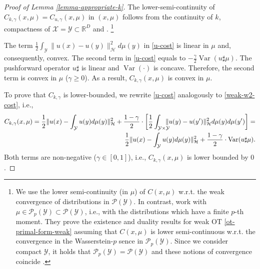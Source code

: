 \documentclass{article} %
\DeclareMathOperator{\Var}{Var}
\begin{document}
\begin{proof}[Proof of Lemma \ref{lemma-appropriate-k}] The  lower-semi-continuity of $C_{k,\gamma}(x,\mu)=C_{u,\gamma}(x,\mu)$ in $(x,\mu)$ follows from the continuity of $k$, compactness of $\mathcal{X}=\mathcal{Y}\subset\mathbb{R}^{D}$ and \citep[Lemma 7.3]{santambrogio2015optimal}.
\footnote{We use the lower semi-continuity (in $\mu$) of $C(x,\mu)$ w.r.t. the weak convergence of distributions in $\mathcal{P}(\mathcal{Y})$. In contrast, \cite{backhoff2019existence} work with $\mu\in \mathcal{P}_{p}(\mathcal{Y})\subset \mathcal{P}(\mathcal{Y})$, i.e., with the distributions which have a finite $p$-th moment. They prove the existence and duality results for weak OT \eqref{ot-primal-form-weak} assuming that $C(x,\mu)$ is lower semi-continuous w.r.t. the convergence in the Wasserstein-$p$ sence in $\mathcal{P}_{p}(\mathcal{Y})$. Since we consider compact $\mathcal{Y}$, it holds that $\mathcal{P}_{p}(\mathcal{Y})= \mathcal{P}(\mathcal{Y})$ and these notions of convergence coincide \citep[Def. 6.8]{villani2008optimal}.}

The term $\frac{1}{2}\int_{\mathcal{Y}}\|u(x)-u(y)\|^{2}_{\mathcal{H}}d\mu(y)$ in \eqref{u-cost} is linear in $\mu$ and, consequently, convex. The second term in \eqref{u-cost} equals to $-\frac{\gamma}{2}\Var(u\sharp\mu)$. The pushforward operator $u\sharp$ is linear and $\Var(\cdot)$ is concave. Therefore, the second term is convex in $\mu$ ($\gamma\geq 0$). As a result, $C_{k,\gamma}(x,\mu)$ is convex in $\mu$.

To prove that $C_{k,\gamma}$ is lower-bounded, we rewrite \eqref{u-cost} analogously to \eqref{weak-w2-cost}, i.e.,
\begin{eqnarray}
    C_{k,\gamma}(x,\mu)=\frac{1}{2}\|u(x)-\int_{\mathcal{Y}}u(y)d\mu(y)\|^{2}_{\mathcal{H}}+\frac{1-\gamma}{2}\cdot\bigg[\frac{1}{2}\int_{\mathcal{Y}\times\mathcal{Y}}\hspace{-3mm}\|u(y)-u(y')\|_{\mathcal{H}}^{2}d\mu(y)d\mu(y')\bigg]=\nonumber
    \\
    \frac{1}{2}\|u(x)-\int_{\mathcal{Y}}u(y)d\mu(y)\|^{2}_{\mathcal{H}}+\frac{1-\gamma}{2}\cdot\Var(u\sharp\mu).
    \label{u-cost-v2}
\end{eqnarray}
Both terms are non-negative ($\gamma\in[0,1]$), i.e., $C_{k,\gamma}(x,\mu)$ is lower bounded by $0$.
\end{proof}
\end{document}
